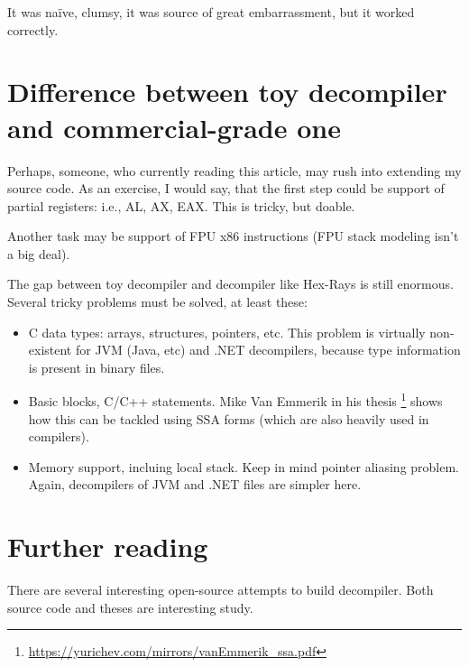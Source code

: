 ﻿\documentclass[12pt]{article}
\begin{document}
It was naïve, clumsy, it was source of great embarrassment, but it worked correctly.

\section{Difference between toy decompiler and commercial-grade one}

Perhaps, someone, who currently reading this article, may rush into extending my source code.
As an exercise, I would say, that the first step could be support of partial registers: i.e., AL, AX, EAX.
This is tricky, but doable.

Another task may be support of FPU x86 instructions (FPU stack modeling isn't a big deal).

The gap between toy decompiler and decompiler like Hex-Rays is still enormous.
Several tricky problems must be solved, at least these:

\begin{itemize}
\item C data types: arrays, structures, pointers, etc.
This problem is virtually non-existent for JVM (Java, etc) and .NET decompilers, because type information
is present in binary files.

\item Basic blocks, C/C++ statements. Mike Van Emmerik in his thesis
\footnote{\url{https://yurichev.com/mirrors/vanEmmerik_ssa.pdf}} shows how this can be tackled using \ac{SSA} forms
(which are also heavily used in compilers).

\item Memory support, incluing local stack. Keep in mind pointer aliasing problem.
Again, decompilers of JVM and .NET files are simpler here.
\end{itemize}

\section{Further reading}

There are several interesting open-source attempts to build decompiler.
Both source code and theses are interesting study.
\end{document}
